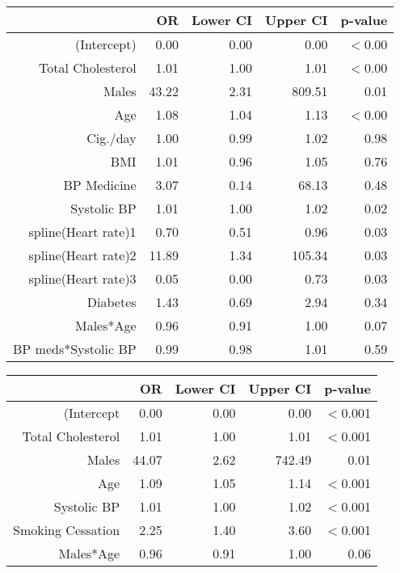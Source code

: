 \documentclass{article}\usepackage[]{graphicx}\usepackage[]{color}
\begin{document}
\begin{table}[ht]
\centering
\begin{tabular}{rrrrr}
  \hline
 & OR & Lower CI & Upper CI & p-value \\ 
  \hline
(Intercept) & 0.00 & 0.00 & 0.00 & $<$0.00 \\ 
  Total Cholesterol & 1.01 & 1.00 & 1.01 & $<$0.00 \\ 
  Males & 43.22 & 2.31 & 809.51 & 0.01 \\ 
  Age & 1.08 & 1.04 & 1.13 & $<$0.00 \\ 
  Cig./day & 1.00 & 0.99 & 1.02 & 0.98 \\ 
  BMI & 1.01 & 0.96 & 1.05 & 0.76 \\ 
  BP Medicine & 3.07 & 0.14 & 68.13 & 0.48 \\ 
  Systolic BP & 1.01 & 1.00 & 1.02 & 0.02 \\ 
  spline(Heart rate)1 & 0.70 & 0.51 & 0.96 & 0.03 \\ 
  spline(Heart rate)2 & 11.89 & 1.34 & 105.34 & 0.03 \\ 
  spline(Heart rate)3 & 0.05 & 0.00 & 0.73 & 0.03 \\ 
  Diabetes & 1.43 & 0.69 & 2.94 & 0.34 \\ 
  Males*Age & 0.96 & 0.91 & 1.00 & 0.07 \\ 
  BP meds*Systolic BP & 0.99 & 0.98 & 1.01 & 0.59 \\ 
   \hline
\end{tabular}
\end{table}

\begin{table}[ht]
\centering
\begin{tabular}{rrrrr}
  \hline
 & OR & Lower CI & Upper CI & p-value \\ 
  \hline
(Intercept & 0.00 & 0.00 & 0.00 & $<$0.001 \\ 
  Total Cholesterol & 1.01 & 1.00 & 1.01 & $<$0.001 \\ 
  Males & 44.07 & 2.62 & 742.49 & 0.01 \\ 
  Age & 1.09 & 1.05 & 1.14 & $<$0.001 \\ 
  Systolic BP & 1.01 & 1.00 & 1.02 & $<$0.001 \\ 
  Smoking Cessation & 2.25 & 1.40 & 3.60 & $<$0.001 \\ 
  Males*Age & 0.96 & 0.91 & 1.00 & 0.06 \\ 
   \hline
\end{tabular}
\end{table}
\end{document}
